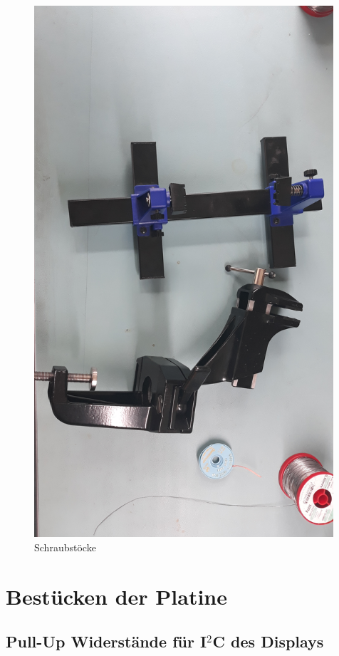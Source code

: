 \documentclass[12pt, a4paper]{article}		%
\begin{document}
\begin{figure}[H]
	\centering
		\includegraphics[width=0.99\textwidth]{Grafiken/20200726_121444.jpg}
	\caption{Schraubstöcke}
	\label{fig:20200726_121444}
\end{figure}


\newpage
\section{Bestücken der Platine}
\subsection{Pull-Up Widerstände für I$^2$C des Displays}
\end{document}
